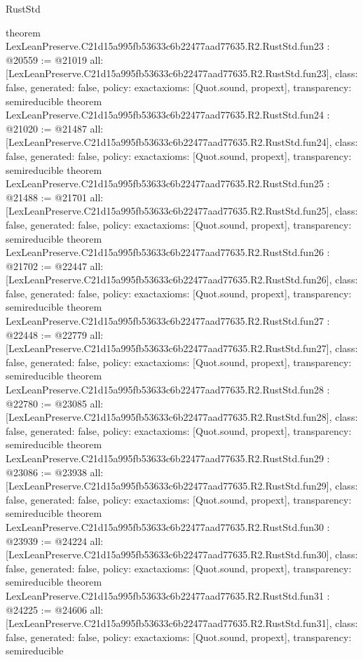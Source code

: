 \begin{lexlean}{RustStd}
\begin{coremodule}
{}
theorem LexLeanPreserve.C21d15a995fb53633c6b22477aad77635.R2.RustStd.fun23 : @20559 := @21019 {
  all: [LexLeanPreserve.C21d15a995fb53633c6b22477aad77635.R2.RustStd.fun23],
  class: false,
  generated: false,
  policy: exact{axioms: [Quot.sound, propext]},
  transparency: semireducible
}
theorem LexLeanPreserve.C21d15a995fb53633c6b22477aad77635.R2.RustStd.fun24 : @21020 := @21487 {
  all: [LexLeanPreserve.C21d15a995fb53633c6b22477aad77635.R2.RustStd.fun24],
  class: false,
  generated: false,
  policy: exact{axioms: [Quot.sound, propext]},
  transparency: semireducible
}
theorem LexLeanPreserve.C21d15a995fb53633c6b22477aad77635.R2.RustStd.fun25 : @21488 := @21701 {
  all: [LexLeanPreserve.C21d15a995fb53633c6b22477aad77635.R2.RustStd.fun25],
  class: false,
  generated: false,
  policy: exact{axioms: [Quot.sound, propext]},
  transparency: semireducible
}
theorem LexLeanPreserve.C21d15a995fb53633c6b22477aad77635.R2.RustStd.fun26 : @21702 := @22447 {
  all: [LexLeanPreserve.C21d15a995fb53633c6b22477aad77635.R2.RustStd.fun26],
  class: false,
  generated: false,
  policy: exact{axioms: [Quot.sound, propext]},
  transparency: semireducible
}
theorem LexLeanPreserve.C21d15a995fb53633c6b22477aad77635.R2.RustStd.fun27 : @22448 := @22779 {
  all: [LexLeanPreserve.C21d15a995fb53633c6b22477aad77635.R2.RustStd.fun27],
  class: false,
  generated: false,
  policy: exact{axioms: [Quot.sound, propext]},
  transparency: semireducible
}
theorem LexLeanPreserve.C21d15a995fb53633c6b22477aad77635.R2.RustStd.fun28 : @22780 := @23085 {
  all: [LexLeanPreserve.C21d15a995fb53633c6b22477aad77635.R2.RustStd.fun28],
  class: false,
  generated: false,
  policy: exact{axioms: [Quot.sound, propext]},
  transparency: semireducible
}
theorem LexLeanPreserve.C21d15a995fb53633c6b22477aad77635.R2.RustStd.fun29 : @23086 := @23938 {
  all: [LexLeanPreserve.C21d15a995fb53633c6b22477aad77635.R2.RustStd.fun29],
  class: false,
  generated: false,
  policy: exact{axioms: [Quot.sound, propext]},
  transparency: semireducible
}
theorem LexLeanPreserve.C21d15a995fb53633c6b22477aad77635.R2.RustStd.fun30 : @23939 := @24224 {
  all: [LexLeanPreserve.C21d15a995fb53633c6b22477aad77635.R2.RustStd.fun30],
  class: false,
  generated: false,
  policy: exact{axioms: [Quot.sound, propext]},
  transparency: semireducible
}
theorem LexLeanPreserve.C21d15a995fb53633c6b22477aad77635.R2.RustStd.fun31 : @24225 := @24606 {
  all: [LexLeanPreserve.C21d15a995fb53633c6b22477aad77635.R2.RustStd.fun31],
  class: false,
  generated: false,
  policy: exact{axioms: [Quot.sound, propext]},
  transparency: semireducible
}
\end{coremodule}
\end{lexlean}

